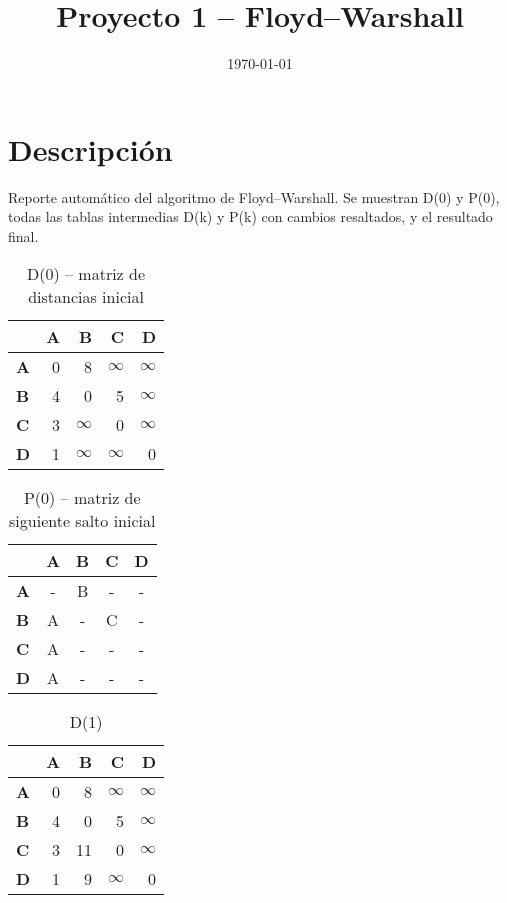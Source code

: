 \documentclass[11pt]{article}
\title{Proyecto 1 – Floyd–Warshall}
\date{\today}
\newcommand{\INF}{$\infty$}
\begin{document}
\maketitle
\section*{Descripción}
Reporte automático del algoritmo de Floyd–Warshall. Se muestran D(0) y P(0), todas las tablas intermedias D(k) y P(k) con cambios resaltados, y el resultado final.

\begin{table}[H]\centering
\caption{D(0) – matriz de distancias inicial}
\begin{tabular}{l r r r r}
\toprule
 & \textbf{A} & \textbf{B} & \textbf{C} & \textbf{D}\\\midrule
\textbf{A} & 0 & 8 & \INF & \INF \\
\textbf{B} & 4 & 0 & 5 & \INF \\
\textbf{C} & 3 & \INF & 0 & \INF \\
\textbf{D} & 1 & \INF & \INF & 0 \\
\bottomrule
\end{tabular}
\end{table}

\begin{table}[H]\centering
\caption{P(0) – matriz de siguiente salto inicial}
\begin{tabular}{l c c c c}
\toprule
 & \textbf{A} & \textbf{B} & \textbf{C} & \textbf{D}\\\midrule
\textbf{A} & - & B & - & - \\
\textbf{B} & A & - & C & - \\
\textbf{C} & A & - & - & - \\
\textbf{D} & A & - & - & - \\
\bottomrule
\end{tabular}
\end{table}

\begin{table}[H]\centering
\caption{D(1)}
\begin{tabular}{l r r r r}
\toprule
 & \textbf{A} & \textbf{B} & \textbf{C} & \textbf{D}\\\midrule
\textbf{A} & 0 & 8 & \INF & \INF \\
\textbf{B} & 4 & 0 & 5 & \INF \\
\textbf{C} & 3 & \cellcolor{yellow!30}11 & 0 & \INF \\
\textbf{D} & 1 & \cellcolor{yellow!30}9 & \INF & 0 \\
\bottomrule
\end{tabular}
\end{table}
\end{document}
